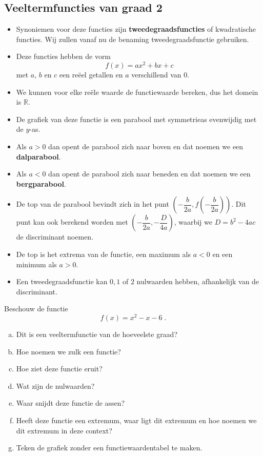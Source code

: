 \documentclass[12pt]{article}
\begin{document}
\begin{theorie}

\pagebreak
\subsection{Veeltermfuncties van graad 2}

\begin{itemize}
\item Synoniemen voor deze functies zijn {\bf tweedegraadsfuncties} of kwadratische functies. Wij zullen vanaf nu de benaming tweedegraadsfunctie gebruiken.
\item Deze functies hebben de vorm
  $$f(x) = ax^2+bx+c $$
  met $a$, $b$ en $c$ een reëel getallen en $a$ verschillend van $0$.
\item We kunnen voor elke reële waarde de functiewaarde bereken, dus het domein is $\mathbb{R}$.
\item De grafiek van deze functie is een parabool met symmetrieas evenwijdig met de $y$-as.
\item Als $a>0$ dan opent de parabool zich naar boven en dat noemen we een {\bf dalparabool}.
\item Als $a<0$ dan opent de parabool zich naar beneden en dat noemen we een {\bf bergparabool}.
\item De top van de parabool bevindt zich in het punt $(-\dfrac{b}{2a}, f(-\dfrac{b}{2a}))$. Dit punt kan ook berekend worden met $(-\dfrac{b}{2a}, -\dfrac{D}{4a})$, waarbij we $D=b^2-4ac$ de discriminant noemen.
\item De top is het extrema van de functie, een maximum als $a<0$ en een minimum als $a>0$.
\item Een tweedegraadsfunctie kan $0, 1$ of $2$ nulwaarden hebben, afhankelijk van de discriminant.
\end{itemize}

\end{theorie}

\begin{oefening}
  Beschouw de functie
  $$f(x)=x^2-x-6\;.$$
  \begin{enumerate}[(a)]
  \item Dit is een veeltermfunctie van de hoeveelste graad?
  \item Hoe noemen we zulk een functie?
  \item Hoe ziet deze functie eruit?
  \item Wat zijn de nulwaarden?
  \item Waar snijdt deze functie de assen?
  \item Heeft deze functie een extremum, waar ligt dit extremum en hoe noemen we dit extremum in deze context?
  \item Teken de grafiek zonder een functiewaardentabel te maken.
  \end{enumerate}
\end{oefening}
\end{document}
